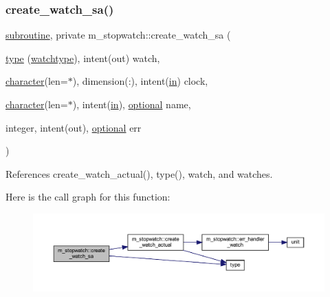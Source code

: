 \subsubsection{\texorpdfstring{create\+\_\+watch\+\_\+sa()}{create\_watch\_sa()}}
{\footnotesize\ttfamily \hyperlink{M__stopwatch_83_8txt_acfbcff50169d691ff02d4a123ed70482}{subroutine}, private m\+\_\+stopwatch\+::create\+\_\+watch\+\_\+sa (\begin{DoxyParamCaption}\item[{\hyperlink{stop__watch_83_8txt_a70f0ead91c32e25323c03265aa302c1c}{type} (\hyperlink{structm__stopwatch_1_1watchtype}{watchtype}), intent(out)}]{watch,  }\item[{\hyperlink{option__stopwatch_83_8txt_abd4b21fbbd175834027b5224bfe97e66}{character}(len=$\ast$), dimension(\+:), intent(\hyperlink{M__journal_83_8txt_afce72651d1eed785a2132bee863b2f38}{in})}]{clock,  }\item[{\hyperlink{option__stopwatch_83_8txt_abd4b21fbbd175834027b5224bfe97e66}{character}(len=$\ast$), intent(\hyperlink{M__journal_83_8txt_afce72651d1eed785a2132bee863b2f38}{in}), \hyperlink{option__stopwatch_83_8txt_aa4ece75e7acf58a4843f70fe18c3ade5}{optional}}]{name,  }\item[{integer, intent(out), \hyperlink{option__stopwatch_83_8txt_aa4ece75e7acf58a4843f70fe18c3ade5}{optional}}]{err }\end{DoxyParamCaption})\hspace{0.3cm}{\ttfamily [private]}}



References create\+\_\+watch\+\_\+actual(), type(), watch, and watches.

Here is the call graph for this function\+:
\nopagebreak
\begin{figure}[H]
\begin{center}
\leavevmode
\includegraphics[width=350pt]{namespacem__stopwatch_aee0f1d95fc46e6d8008b931e0ec60075_cgraph}
\end{center}
\end{figure}
\mbox{\label{namespacem__stopwatch_a189c66a0795f7cfe9b1f2d2be3248f2c}} 
